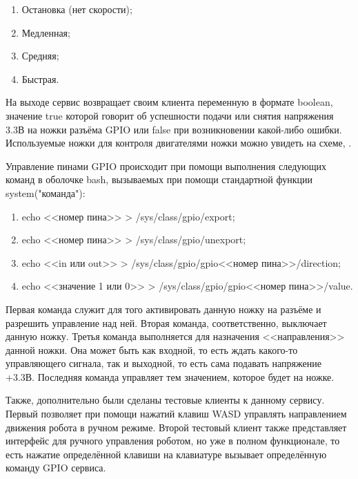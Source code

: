 \begin{enumerate}
\item Остановка (нет скорости);
\item Медленная;
\item Средняя;
\item Быстрая.
\end{enumerate}

На выходе сервис возвращает своим клиента переменную в формате boolean, значение true которой говорит об успешности подачи или снятия напряжения 3.3В на ножки разъёма GPIO или false при возникновении какой-либо ошибки. Используемые ножки для контроля двигателями ножки можно увидеть на схеме, .

Управление пинами GPIO происходит при помощи выполнения следующих команд в оболочке bash, вызываемых при помощи стандартной функции system("команда"):
\begin{enumerate}
\item echo <<номер пина>> > /sys/class/gpio/export;
\item echo <<номер пина>> > /sys/class/gpio/unexport;
\item echo <<in или out>> > /sys/class/gpio/gpio<<номер пина>>/direction;
\item echo <<значение 1 или 0>> > /sys/class/gpio/gpio<<номер пина>>/value.
\end{enumerate} 

Первая команда служит для того активировать данную ножку на разъёме и разрешить управление над ней. Вторая команда, соответственно, выключает данную ножку. Третья команда выполняется для назначения <<направления>> данной ножки. Она может быть как входной, то есть ждать какого-то управляющего сигнала, так и выходной, то есть сама подавать напряжение +3.3В. Последняя команда управляет тем значением, которое будет на ножке.

Также, дополнительно были сделаны тестовые клиенты к данному сервису. Первый позволяет при помощи нажатий клавиш WASD управлять направлением движения робота в ручном режиме. Второй тестовый клиент также представляет интерфейс для ручного управления роботом, но уже в полном функционале, то есть нажатие определённой клавиши на клавиатуре вызывает определённую команду GPIO сервиса.

